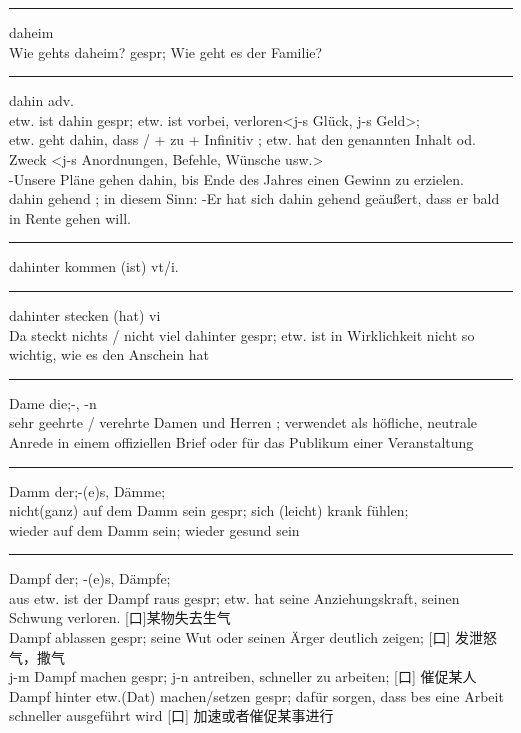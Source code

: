 \noindent\rule{\textwidth}{1pt}
daheim \\
Wie gehts daheim? gespr; Wie geht es der Familie? \\

\noindent\rule{\textwidth}{1pt}
dahin adv. \\
etw. ist dahin gespr; etw. ist vorbei, verloren<j-s Gl\"uck, j-s Geld>; \\
etw. geht dahin, dass / + zu + Infinitiv ; etw. hat den genannten Inhalt od. Zweck <j-s Anordnungen, Befehle, W\"unsche usw.> \\
-Unsere Pl\"ane gehen dahin, bis Ende des Jahres einen Gewinn zu erzielen. \\
dahin gehend ; in diesem Sinn: -Er hat sich dahin gehend ge\"au\ss{}ert, dass er bald in Rente gehen will. 

\noindent\rule{\textwidth}{1pt}
dahinter kommen (ist) vt/i.\\

\noindent\rule{\textwidth}{1pt}
dahinter stecken (hat) vi \\
Da steckt nichts / nicht viel dahinter gespr; etw. ist in Wirklichkeit nicht so wichtig, wie es den Anschein hat \\

\noindent\rule{\textwidth}{1pt}
Dame die;-, -n \\
sehr geehrte / verehrte Damen und Herren ; verwendet als h\"ofliche, neutrale Anrede in einem offiziellen Brief oder f\"ur das Publikum einer Veranstaltung\\

\noindent\rule{\textwidth}{1pt}
Damm der;-(e)s, D\"amme; \\
nicht(ganz) auf dem Damm sein gespr; sich (leicht) krank f\"uhlen;\\
wieder auf dem Damm sein; wieder gesund sein \\

\noindent\rule{\textwidth}{1pt}
Dampf der; -(e)s, D\"ampfe;\\
aus etw. ist der Dampf raus gespr; etw. hat seine Anziehungskraft, seinen Schwung verloren. [口]某物失去生气\\
Dampf ablassen gespr; seine Wut oder seinen \"Arger deutlich zeigen; [口] 发泄怒气，撒气 \\
j-m Dampf machen gespr; j-n antreiben, schneller zu arbeiten; [口] 催促某人 \\
Dampf hinter etw.(Dat) machen/setzen gespr; daf\"ur sorgen, dass bes eine Arbeit schneller ausgef\"uhrt wird [口] 加速或者催促某事进行 \\


